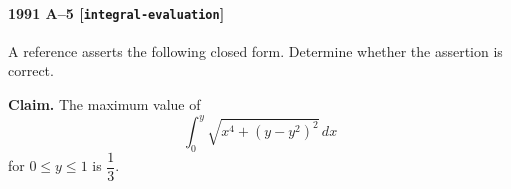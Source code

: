 \paragraph{1991 A--5 \textnormal{[\texttt{integral-evaluation}]}}
A reference asserts the following closed form. Determine whether the
assertion is correct.

\textbf{Claim.} The maximum value of
\[
\int_0^y \sqrt{x^4 + (y - y^2)^2}\,dx
\]
for $0 \le y \le 1$ is $\dfrac{1}{3}$.

